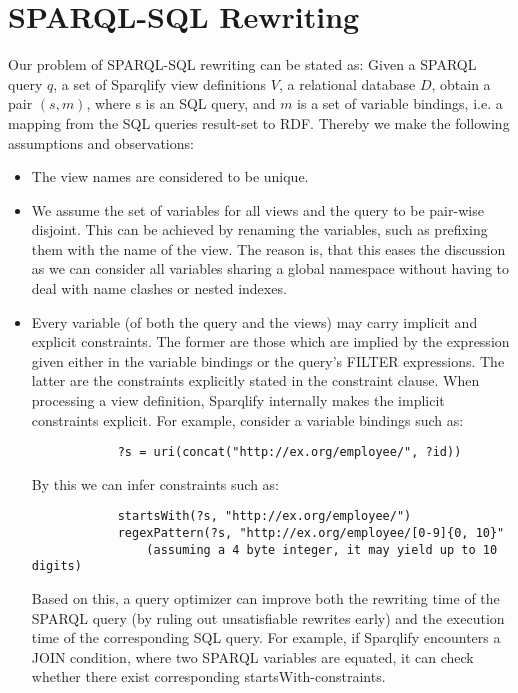 \documentclass[a4paper,twoside,bibtotoc,abstracton,12pt,BCOR=15mm]{scrreprt}
\begin{document}
\section{SPARQL-SQL Rewriting}
Our problem of SPARQL-SQL rewriting can be stated as:
Given a SPARQL query $q$, a set of Sparqlify view definitions $V$, a relational database $D$, obtain a pair $(s, m)$, where s is an SQL query, and $m$ is a set of variable bindings, i.e. a mapping from the SQL queries result-set to RDF. 
Thereby we make the following assumptions and observations:
\begin{itemize}
  \item The view names are considered to be unique.
  \item We assume the set of variables for all views and the query to be pair-wise disjoint.
		This can be achieved by renaming the variables, such as prefixing them with the name of the view.
		The reason is, that this eases the discussion as we can consider all variables sharing a global namespace without having to deal with name clashes or nested
		indexes.
  \item Every variable (of both the query and the views) may carry implicit and explicit constraints. 
		The former are those which are implied by the expression given either in the variable bindings or the query's FILTER expressions.
		The latter are the constraints explicitly stated in the constraint clause. 
		When processing a view definition, Sparqlify internally makes the implicit constraints explicit. 
		For example, consider a variable bindings such as:
		\begin{lstlisting}
			?s = uri(concat("http://ex.org/employee/", ?id))
		\end{lstlisting}
		By this we can infer constraints such as:
		\begin{lstlisting}
			startsWith(?s, "http://ex.org/employee/")
			regexPattern(?s, "http://ex.org/employee/[0-9]{0, 10}"
			    (assuming a 4 byte integer, it may yield up to 10 digits)
		\end{lstlisting}
		Based on this, a query optimizer can improve both the rewriting time of the SPARQL query (by ruling out unsatisfiable rewrites early)
		and the execution time of the corresponding SQL query. 
		For example, if Sparqlify encounters a JOIN condition, where two SPARQL variables are equated, it can check whether there exist corresponding startsWith-constraints. 

\end{itemize}
\end{document}
